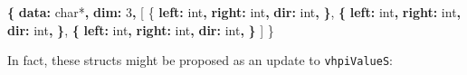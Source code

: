 \documentclass[
]{article}
\newenvironment{Shaded}{\begin{snugshade}}{\end{snugshade}}
\newcommand{\AttributeTok}[1]{\textcolor[rgb]{0.13,0.29,0.53}{#1}}
\newcommand{\DecValTok}[1]{\textcolor[rgb]{0.00,0.00,0.81}{#1}}
\newcommand{\FunctionTok}[1]{\textcolor[rgb]{0.13,0.29,0.53}{\textbf{#1}}}
\newcommand{\KeywordTok}[1]{\textcolor[rgb]{0.13,0.29,0.53}{\textbf{#1}}}
\begin{document}
\begin{Shaded}
\begin{Highlighting}[]
\KeywordTok{\{}
\AttributeTok{  }\FunctionTok{data}\KeywordTok{:}\AttributeTok{ char*}\KeywordTok{,}
\AttributeTok{  }\FunctionTok{dim}\KeywordTok{:}\AttributeTok{ }\DecValTok{3}\KeywordTok{,}
\AttributeTok{  [}
\AttributeTok{    \{}
\AttributeTok{        }\FunctionTok{left}\KeywordTok{:}\AttributeTok{ int}\KeywordTok{,}
\AttributeTok{        }\FunctionTok{right}\KeywordTok{:}\AttributeTok{ int}\KeywordTok{,}
\AttributeTok{        }\FunctionTok{dir}\KeywordTok{:}\AttributeTok{ int}\KeywordTok{,}
\AttributeTok{    }\KeywordTok{\}}\AttributeTok{,}
\AttributeTok{    }\KeywordTok{\{}
\AttributeTok{        }\FunctionTok{left}\KeywordTok{:}\AttributeTok{ int}\KeywordTok{,}
\AttributeTok{        }\FunctionTok{right}\KeywordTok{:}\AttributeTok{ int}\KeywordTok{,}
\AttributeTok{        }\FunctionTok{dir}\KeywordTok{:}\AttributeTok{ int}\KeywordTok{,}
\AttributeTok{    }\KeywordTok{\}}\AttributeTok{,}
\AttributeTok{    }\KeywordTok{\{}
\AttributeTok{        }\FunctionTok{left}\KeywordTok{:}\AttributeTok{ int}\KeywordTok{,}
\AttributeTok{        }\FunctionTok{right}\KeywordTok{:}\AttributeTok{ int}\KeywordTok{,}
\AttributeTok{        }\FunctionTok{dir}\KeywordTok{:}\AttributeTok{ int}\KeywordTok{,}
\AttributeTok{    }\KeywordTok{\}}
\AttributeTok{  ]}
\AttributeTok{\}}
\end{Highlighting}
\end{Shaded}

In fact, these structs might be proposed as an update to \texttt{vhpiValueS}:
\end{document}
